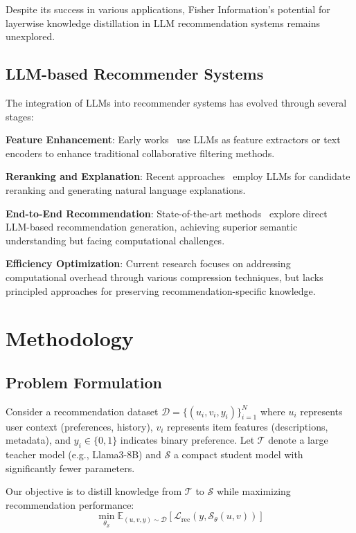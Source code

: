 \documentclass[10pt,conference]{IEEEtran}
\newcommand{\loss}{\mathcal{L}}
\newcommand{\student}{\mathcal{S}}
\newcommand{\teacher}{\mathcal{T}}
\begin{document}
Despite its success in various applications, Fisher Information's potential for layerwise knowledge distillation in LLM recommendation systems remains unexplored.

\subsection{LLM-based Recommender Systems}

The integration of LLMs into recommender systems has evolved through several stages:

\textbf{Feature Enhancement}: Early works~\cite{hou2022towards,zhang2021neural} use LLMs as feature extractors or text encoders to enhance traditional collaborative filtering methods.

\textbf{Reranking and Explanation}: Recent approaches~\cite{li2023chatgpt,dai2023uncovering} employ LLMs for candidate reranking and generating natural language explanations.

\textbf{End-to-End Recommendation}: State-of-the-art methods~\cite{geng2022recommendation,bao2023tallrec} explore direct LLM-based recommendation generation, achieving superior semantic understanding but facing computational challenges.

\textbf{Efficiency Optimization}: Current research focuses on addressing computational overhead through various compression techniques, but lacks principled approaches for preserving recommendation-specific knowledge.

\section{Methodology}

\subsection{Problem Formulation}

Consider a recommendation dataset $\mathcal{D} = \{(u_i, v_i, y_i)\}_{i=1}^N$ where $u_i$ represents user context (preferences, history), $v_i$ represents item features (descriptions, metadata), and $y_i \in \{0,1\}$ indicates binary preference. Let $\teacher$ denote a large teacher model (e.g., Llama3-8B) and $\student$ a compact student model with significantly fewer parameters.

Our objective is to distill knowledge from $\teacher$ to $\student$ while maximizing recommendation performance:
\begin{equation}
\min_{\theta_{\student}} \mathbb{E}_{(u,v,y) \sim \mathcal{D}} \left[ \loss_{\text{rec}}(y, \student_{\theta}(u,v)) \right]
\end{equation}
\end{document}
